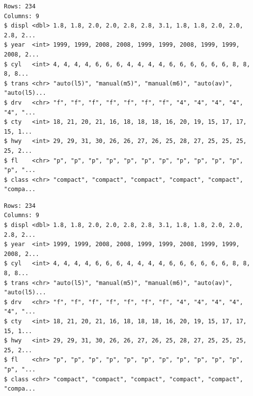 \documentclass[
  11pt,
]{krantz}
\newenvironment{Shaded}{\begin{snugshade}}{\end{snugshade}}
\newcommand{\CommentTok}[1]{\textcolor[rgb]{0.37,0.37,0.37}{\textit{#1}}}
\newcommand{\KeywordTok}[1]{\textcolor[rgb]{0.27,0.27,0.27}{\textbf{#1}}}
\newcommand{\NormalTok}[1]{#1}
\newcommand{\OperatorTok}[1]{\textcolor[rgb]{0.43,0.43,0.43}{\textbf{#1}}}
\newcommand{\StringTok}[1]{\textcolor[rgb]{0.5,0.5,0.5}{#1}}
\begin{document}
\footnotesize

\begin{Shaded}
\end{Shaded}

\begin{verbatim}
Rows: 234
Columns: 9
$ displ <dbl> 1.8, 1.8, 2.0, 2.0, 2.8, 2.8, 3.1, 1.8, 1.8, 2.0, 2.0, 2.8, 2...
$ year  <int> 1999, 1999, 2008, 2008, 1999, 1999, 2008, 1999, 1999, 2008, 2...
$ cyl   <int> 4, 4, 4, 4, 6, 6, 6, 4, 4, 4, 4, 6, 6, 6, 6, 6, 6, 8, 8, 8, 8...
$ trans <chr> "auto(l5)", "manual(m5)", "manual(m6)", "auto(av)", "auto(l5)...
$ drv   <chr> "f", "f", "f", "f", "f", "f", "f", "4", "4", "4", "4", "4", "...
$ cty   <int> 18, 21, 20, 21, 16, 18, 18, 18, 16, 20, 19, 15, 17, 17, 15, 1...
$ hwy   <int> 29, 29, 31, 30, 26, 26, 27, 26, 25, 28, 27, 25, 25, 25, 25, 2...
$ fl    <chr> "p", "p", "p", "p", "p", "p", "p", "p", "p", "p", "p", "p", "...
$ class <chr> "compact", "compact", "compact", "compact", "compact", "compa...
\end{verbatim}

\begin{Shaded}
\end{Shaded}

\begin{verbatim}
Rows: 234
Columns: 9
$ displ <dbl> 1.8, 1.8, 2.0, 2.0, 2.8, 2.8, 3.1, 1.8, 1.8, 2.0, 2.0, 2.8, 2...
$ year  <int> 1999, 1999, 2008, 2008, 1999, 1999, 2008, 1999, 1999, 2008, 2...
$ cyl   <int> 4, 4, 4, 4, 6, 6, 6, 4, 4, 4, 4, 6, 6, 6, 6, 6, 6, 8, 8, 8, 8...
$ trans <chr> "auto(l5)", "manual(m5)", "manual(m6)", "auto(av)", "auto(l5)...
$ drv   <chr> "f", "f", "f", "f", "f", "f", "f", "4", "4", "4", "4", "4", "...
$ cty   <int> 18, 21, 20, 21, 16, 18, 18, 18, 16, 20, 19, 15, 17, 17, 15, 1...
$ hwy   <int> 29, 29, 31, 30, 26, 26, 27, 26, 25, 28, 27, 25, 25, 25, 25, 2...
$ fl    <chr> "p", "p", "p", "p", "p", "p", "p", "p", "p", "p", "p", "p", "...
$ class <chr> "compact", "compact", "compact", "compact", "compact", "compa...
\end{verbatim}
\end{document}
